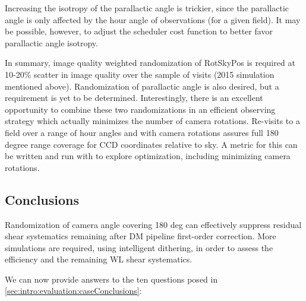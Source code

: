 Increasing the isotropy of the parallactic angle is trickier, since the
parallactic angle is only affected by the hour angle of observations (for a
given field).  It may be possible, however, to adjust the scheduler cost
function to better favor parallactic angle isotropy.

In summary, image quality weighted randomization of RotSkyPos is required at
10-20\% scatter in image quality over the sample of visits (2015 simulation
mentioned above).  Randomization of parallactic angle is also desired, but a
requirement is yet to be determined.  Interestingly, there is an excellent
opportunity to combine these two randomizations in an efficient observing
strategy which actually minimizes the number of camera rotations.  Re-visits to
a field over a range of hour angles and with camera rotations assures full 180
degree range coverage for CCD coordinates relative to sky.  A metric for this
can be written and run with \OpSim to explore optimization, including minimizing
camera rotations.

\subsection{Conclusions}

Randomization of camera angle covering 180 deg can effectively suppress
residual shear systematics remaining after DM pipeline first-order
correction.   More simulations are required, using intelligent
dithering, in order to assess the efficiency and the remaining WL shear
systematics.


We can now provide answers to the ten questions posed in %
\autoref{sec:intro:evaluation:caseConclusions}:

